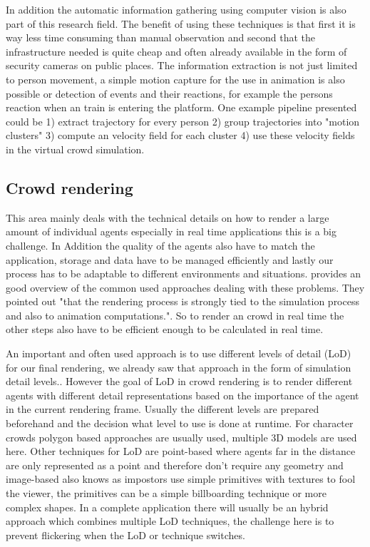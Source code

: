 \documentclass[sigconf]{acmart}
\begin{document}
In addition the automatic information gathering using computer vision is also part of this research field. The benefit of using these techniques is that first it is way less time consuming than manual observation and second that the infrastructure needed is quite cheap and often already available in the form of security cameras on public places. The information extraction is not just limited to person movement, a simple motion capture for the use in animation is also possible or detection of events and their reactions, for example the persons reaction when an train is entering the platform. One example pipeline \cite{thalmann_crowd_2013} presented could be 1) extract trajectory for every person 2) group trajectories into "motion clusters" 3) compute an velocity field for each cluster 4) use these velocity fields in the virtual crowd simulation. 

\cite{thalmann_crowd_2013}

\subsection{Crowd rendering}

This area mainly deals with the technical details on how to render a large amount of individual agents especially in real time applications this is a big challenge. In Addition the quality of the agents also have to match the application, storage and data have to be managed  efficiently and lastly our process has to be adaptable to different environments and situations. 
\cite{beacco_survey_2016} provides an good overview of the common used approaches dealing with these problems. They pointed out "that the rendering process is strongly tied to the simulation process and also to animation computations.". So to render an crowd in real time the other steps also have to be efficient enough to be calculated in real time.  

An important and often used approach is to use different levels of detail (LoD) for our final rendering, we already saw that approach in the form of simulation detail levels.\cite{osullivan_levels_2002}. However the goal of LoD in crowd rendering is to render different agents with different detail representations based on the importance of the agent in the current rendering frame. Usually the different levels are prepared beforehand and the decision what level to use is done at runtime. For character crowds polygon based approaches are usually used, multiple 3D models are used here. Other techniques for LoD are point-based where agents far in the distance are only represented as a point and therefore don't require any geometry and image-based also knows as impostors use simple primitives with textures to fool the viewer, the primitives can be a simple billboarding technique or more complex shapes. In a complete application there will usually be an hybrid approach which combines multiple LoD techniques, the challenge here is to prevent flickering when the LoD or technique switches. 
\end{document}
